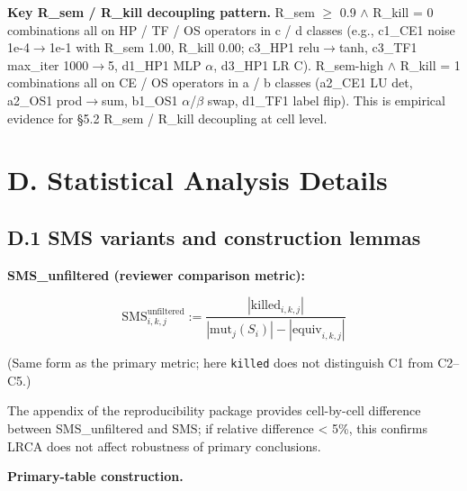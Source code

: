 \documentclass[acmsmall,screen,review]{acmart}
\begin{document}
\textbf{Key R\_sem / R\_kill decoupling pattern.} R\_sem $\geq$ 0.9 $\wedge$ R\_kill
= 0 combinations all on HP / TF / OS operators in c / d classes (e.g.,
c1\_CE1 noise 1e-4$\to$1e-1 with R\_sem 1.00, R\_kill 0.00; c3\_HP1
relu$\to$tanh, c3\_TF1 max\_iter 1000$\to$5, d1\_HP1 MLP $\alpha$, d3\_HP1 LR C).
R\_sem-high $\wedge$ R\_kill = 1 combinations all on CE / OS operators in a / b
classes (a2\_CE1 LU det, a2\_OS1 prod$\to$sum, b1\_OS1 $\alpha$/$\beta$ swap, d1\_TF1
label flip). This is empirical evidence for §5.2 R\_sem / R\_kill
decoupling at cell level.


\section{D. Statistical Analysis Details}\label{d.-statistical-analysis-details}

\subsection{D.1 SMS variants and construction lemmas}\label{d.1-sms-variants-and-construction-lemmas}

\textbf{SMS\_unfiltered (reviewer comparison metric):}

\[
\mathrm{SMS}^{\mathrm{unfiltered}}_{i,k,j} := \frac{|\mathrm{killed}_{i,k,j}|}{|\mathrm{mut}_j(S_i)| - |\mathrm{equiv}_{i,k,j}|}
\]

(Same form as the primary metric; here \texttt{killed} does not distinguish C1 from C2--C5.)

The appendix of the reproducibility package provides cell-by-cell
difference between SMS\_unfiltered and SMS; if relative difference
\textless{} 5\%, this confirms LRCA does not affect robustness of
primary conclusions.

\textbf{Primary-table construction.}
\end{document}
